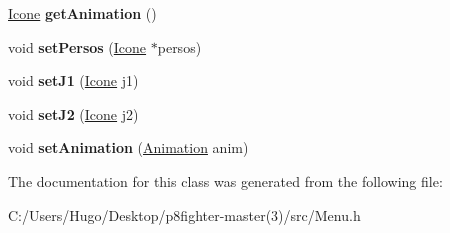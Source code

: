 \begin{DoxyCompactItemize}
\item 
\mbox{\label{class_menu_a97e75692b51546742913feb17d4e13ae}} 
\hyperlink{class_icone}{Icone} {\bfseries get\+Animation} ()
\item 
\mbox{\label{class_menu_abd046d83639cac158359bf721d957d0e}} 
void {\bfseries set\+Persos} (\hyperlink{class_icone}{Icone} $\ast$persos)
\item 
\mbox{\label{class_menu_a6474111bc042c83fec43c4e8ee81c179}} 
void {\bfseries set\+J1} (\hyperlink{class_icone}{Icone} j1)
\item 
\mbox{\label{class_menu_aaf8f1cd4d3802af0aa9dc5d2c6dc2076}} 
void {\bfseries set\+J2} (\hyperlink{class_icone}{Icone} j2)
\item 
\mbox{\label{class_menu_a06dfa9f4a9b1dfc13ba96d9d240b00e7}} 
void {\bfseries set\+Animation} (\hyperlink{class_animation}{Animation} anim)
\end{DoxyCompactItemize}


The documentation for this class was generated from the following file\+:\begin{DoxyCompactItemize}
\item 
C\+:/\+Users/\+Hugo/\+Desktop/p8fighter-\/master(3)/src/Menu.\+h\end{DoxyCompactItemize}
